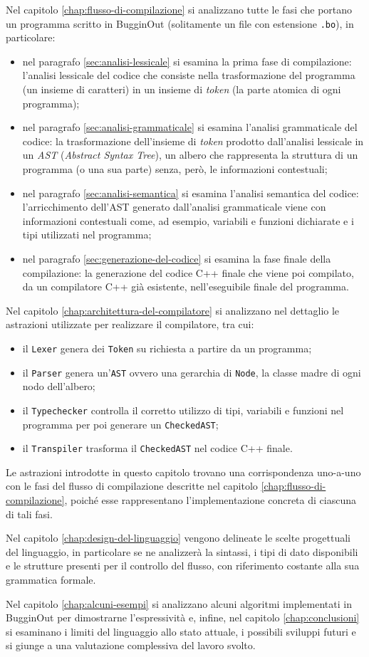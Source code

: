 Nel capitolo \ref{chap:flusso-di-compilazione} si analizzano tutte le fasi che portano un programma scritto in BugginOut (solitamente un file con estensione \texttt{.bo}), in particolare:
\begin{itemize}
	\item nel paragrafo \ref{sec:analisi-lessicale} si esamina la prima fase di compilazione: l'analisi lessicale del codice che consiste nella trasformazione del programma (un insieme di caratteri) in un insieme di \textit{token} (la parte atomica di ogni programma);
	\item nel paragrafo \ref{sec:analisi-grammaticale} si esamina l'analisi grammaticale del codice: la trasformazione dell'insieme di \textit{token} prodotto dall'analisi lessicale in un \textit{AST} (\textit{Abstract Syntax Tree}), un albero che rappresenta la struttura di un programma (o una sua parte) senza, per\`o, le informazioni contestuali;
	\item nel paragrafo \ref{sec:analisi-semantica} si esamina l'analisi semantica del codice: l'arricchimento dell'AST generato dall'analisi grammaticale viene con informazioni contestuali come, ad esempio, variabili e funzioni dichiarate e i tipi utilizzati nel programma;
	\item nel paragrafo \ref{sec:generazione-del-codice} si esamina la fase finale della compilazione: la generazione del codice C++ finale che viene poi compilato, da un compilatore C++ gi\`a esistente, nell'eseguibile finale del programma.
\end{itemize}
Nel capitolo \ref{chap:architettura-del-compilatore} si analizzano nel dettaglio le astrazioni utilizzate per realizzare il compilatore, tra cui:
\begin{itemize}
	\item il \texttt{Lexer} genera dei \texttt{Token} su richiesta a partire da un programma;
	\item il \texttt{Parser} genera un'\texttt{AST} ovvero una gerarchia di \texttt{Node}, la classe madre di ogni nodo dell'albero;
	\item il \texttt{Typechecker} controlla il corretto utilizzo di tipi, variabili e funzioni nel programma per poi generare un \texttt{CheckedAST};
	\item il \texttt{Transpiler} trasforma il \texttt{CheckedAST} nel codice C++ finale.
\end{itemize}
Le astrazioni introdotte in questo capitolo trovano una corrispondenza uno-a-uno con le fasi del flusso di compilazione descritte nel capitolo \ref{chap:flusso-di-compilazione}, poiché esse rappresentano l’implementazione concreta di ciascuna di tali fasi.

Nel capitolo \ref{chap:design-del-linguaggio} vengono delineate le scelte progettuali del linguaggio, in particolare se ne analizzer\`a la sintassi, i tipi di dato disponibili e le strutture presenti per il controllo del flusso, con riferimento costante alla sua grammatica formale.

Nel capitolo \ref{chap:alcuni-esempi} si analizzano alcuni algoritmi implementati in BugginOut per dimostrarne l'espressivit\`a e, infine, nel capitolo \ref{chap:conclusioni} si esaminano i limiti del linguaggio allo stato attuale, i possibili sviluppi futuri e si giunge a una valutazione complessiva del lavoro svolto.
